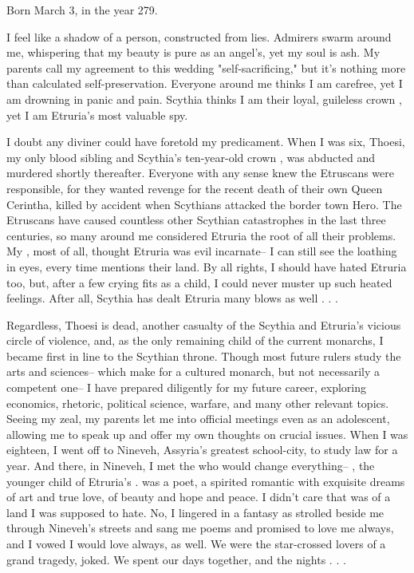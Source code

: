 \documentclass[char]{Kos}
\begin{document}
\name{\cBride{}}

Born March 3, in the year 279.

I feel like a shadow of a person, constructed from lies. Admirers swarm around me, whispering that my beauty is pure as an angel's, yet my soul is ash. My parents call my agreement to this wedding "self-sacrificing," but it's nothing more than calculated self-preservation. Everyone around me thinks I am carefree, yet I am drowning in panic and pain. Scythia thinks I am their loyal, guileless crown \cBride{\prince}, yet I am Etruria's most valuable spy.

I doubt any diviner could have foretold my predicament. When I was six, Thoesi, my only blood sibling and Scythia's ten-year-old crown \cFugitive{\prince}, was abducted and murdered shortly thereafter. Everyone with any sense knew the Etruscans were responsible, for they wanted revenge for the recent death of their own Queen Cerintha, killed by accident when Scythians attacked the border town Hero. The Etruscans have caused countless other Scythian catastrophes in the last three centuries, so many around me considered Etruria the root of all their problems. My \cScythiaQueen{\parent}, most of all, thought Etruria was evil incarnate-- I can still see the loathing in \cScythiaQueen{\their} eyes, every time \cScythiaQueen{\they} mentions their land. By all rights, I should have hated Etruria too, but, after a few crying fits as a child, I could never muster up such heated feelings. After all, Scythia has dealt Etruria many blows as well . . .

Regardless, Thoesi is dead, another casualty of the Scythia and Etruria's vicious circle of violence, and, as the only remaining child of the current monarchs, I became first in line to the Scythian throne. Though most future rulers study the arts and sciences-- which make for a cultured monarch, but not necessarily a competent one-- I have prepared diligently for my future career, exploring economics, rhetoric, political science, warfare, and many other relevant topics. Seeing my zeal, my parents let me into official meetings even as an adolescent, allowing me to speak up and offer my own thoughts on crucial issues. When I was eighteen, I went off to Nineveh, Assyria's greatest school-city, to study law for a year. And there, in Nineveh, I met the \cPoet{\human} who would change everything-- \cPoet{}, the younger child of Etruria's \cEtruriaKing{\monarch}. \cPoet{\They} was a poet, a spirited romantic with exquisite dreams of art and true love, of beauty and hope and peace. I didn't care that \cPoet{\they} was \cPoet{\prince} of a land I was supposed to hate. No, I lingered in a fantasy as \cPoet{\they} strolled beside me through Nineveh's streets and sang me poems and promised to love me always, and I vowed I would love \cPoet{\them} always, as well. We were the star-crossed lovers of a grand tragedy, \cPoet{\they} joked. We spent our days together, and the nights . . .
\end{document}
